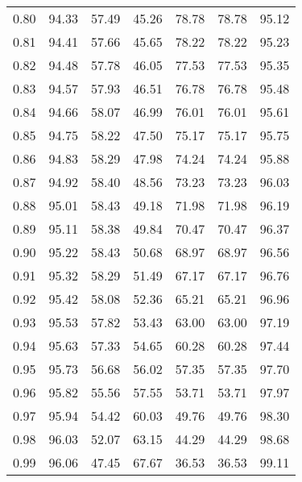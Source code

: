 \begin{tabular}{|c|c|c|c|c|c|c|}
      0.80 &     94.33 &     57.49 &      45.26 &   78.78 &      78.78 &         95.12 \\
      0.81 &     94.41 &     57.66 &      45.65 &   78.22 &      78.22 &         95.23 \\
      0.82 &     94.48 &     57.78 &      46.05 &   77.53 &      77.53 &         95.35 \\
      0.83 &     94.57 &     57.93 &      46.51 &   76.78 &      76.78 &         95.48 \\
      0.84 &     94.66 &     58.07 &      46.99 &   76.01 &      76.01 &         95.61 \\
      0.85 &     94.75 &     58.22 &      47.50 &   75.17 &      75.17 &         95.75 \\
      0.86 &     94.83 &     58.29 &      47.98 &   74.24 &      74.24 &         95.88 \\
      0.87 &     94.92 &     58.40 &      48.56 &   73.23 &      73.23 &         96.03 \\
      0.88 &     95.01 &     58.43 &      49.18 &   71.98 &      71.98 &         96.19 \\
      0.89 &     95.11 &     58.38 &      49.84 &   70.47 &      70.47 &         96.37 \\
      0.90 &     95.22 &     58.43 &      50.68 &   68.97 &      68.97 &         96.56 \\
      0.91 &     95.32 &     58.29 &      51.49 &   67.17 &      67.17 &         96.76 \\
      0.92 &     95.42 &     58.08 &      52.36 &   65.21 &      65.21 &         96.96 \\
      0.93 &     95.53 &     57.82 &      53.43 &   63.00 &      63.00 &         97.19 \\
      0.94 &     95.63 &     57.33 &      54.65 &   60.28 &      60.28 &         97.44 \\
      0.95 &     95.73 &     56.68 &      56.02 &   57.35 &      57.35 &         97.70 \\
      0.96 &     95.82 &     55.56 &      57.55 &   53.71 &      53.71 &         97.97 \\
      0.97 &     95.94 &     54.42 &      60.03 &   49.76 &      49.76 &         98.30 \\
      0.98 &     96.03 &     52.07 &      63.15 &   44.29 &      44.29 &         98.68 \\
      0.99 &     96.06 &     47.45 &      67.67 &   36.53 &      36.53 &         99.11 \\
\bottomrule
\end{tabular}

